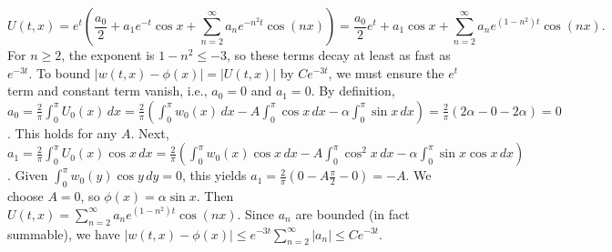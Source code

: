 \documentclass{article}
\begin{document}
\begin{enumerate}[label=\fbox{\arabic*}]
\begin{enumerate}[label=(\arabic*)]
                \[
                  U(t, x) = e^t \left( \frac{a_0}{2} + a_1 e^{-t} \cos x + \sum_{n=2}^\infty a_n e^{-n^2 t} \cos(nx) \right) = \frac{a_0}{2} e^t + a_1 \cos x + \sum_{n=2}^\infty a_n e^{(1-n^2)t} \cos(nx).
                \]
                For $n \ge 2$, the exponent is $1-n^2 \le -3$, so these terms decay at least as fast as $e^{-3t}$.
                To bound $|w(t, x) - \phi(x)| = |U(t, x)|$ by $C e^{-3t}$, we must ensure the $e^t$ term and constant term vanish, i.e., $a_0 = 0$ and $a_1 = 0$.
                By definition, $a_0 = \frac{2}{\pi} \int_0^\pi U_0(x) \, dx = \frac{2}{\pi} \left( \int_0^\pi w_0(x) \, dx - A \int_0^\pi \cos x \, dx - \alpha \int_0^\pi \sin x \, dx \right) = \frac{2}{\pi} (2\alpha - 0 - 2\alpha) = 0$. This holds for any $A$.
                Next, $a_1 = \frac{2}{\pi} \int_0^\pi U_0(x) \cos x \, dx = \frac{2}{\pi} \left( \int_0^\pi w_0(x) \cos x \, dx - A \int_0^\pi \cos^2 x \, dx - \alpha \int_0^\pi \sin x \cos x \, dx \right)$.
                Given $\int_0^\pi w_0(y) \cos y \, dy = 0$, this yields $a_1 = \frac{2}{\pi} (0 - A \frac{\pi}{2} - 0) = -A$.
                We choose $A = 0$, so $\phi(x) = \alpha \sin x$.
                Then $U(t, x) = \sum_{n=2}^\infty a_n e^{(1-n^2)t} \cos(nx)$. Since $a_n$ are bounded (in fact summable), we have $|w(t, x) - \phi(x)| \le e^{-3t} \sum_{n=2}^\infty |a_n| \le C e^{-3t}$.
        \end{enumerate}


\end{enumerate}
\end{document}
